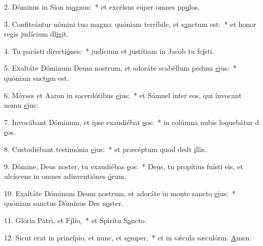 2. Dóminus in Sion m\uline{a}gnus:~* et excélsus super omnes pp\uline{u}los.\par 
3. Confiteántur nómini tuo magno: quóniam terríbile, et s\uline{a}nctum est:~* et honor regis judícium dl\uline{i}git.\par 
4. Tu parásti directi\uline{ó}nes:~* judícium et justítiam in Jacob tu fc\uline{í}sti.\par 
5. Exaltáte Dóminum Deum nostrum, et adoráte scabéllum pedum \uline{e}jus:~* quóniam snct\uline{u}m est.\par 
6. Móyses et Aaron in sacerdótibus \uline{e}jus:~* et Sámuel inter eos, qui ínvocant nomn \uline{e}jus:\par 
7. Invocábant Dóminum, et ipse exaudiébat \uline{e}os:~* in colúmna nubis loquebátur d \uline{e}os.\par 
8. Custodiébant testimónia \uline{e}jus:~* et præcéptum quod dedt \uline{i}llis.\par 
9. Dómine, Deus noster, tu exaudiébas \uline{e}os:~* Deus, tu propítius fuísti eis, et ulcíscens in omnes adinventiónes \uline{ó}rum.\par 
10. Exaltáte Dóminum Deum nostrum, et adoráte in monte sancto \uline{e}jus:~* quóniam sanctus Dóminus Des n\uline{o}ster.\par 
11. Glória Patri, et F\uline{í}lio,~* et Spirítu S\uline{a}ncto.\par 
12. Sicut erat in princípio, et nunc, et s\uline{e}mper,~* et in sǽcula sæculórm. \uline{A}men.\par 
